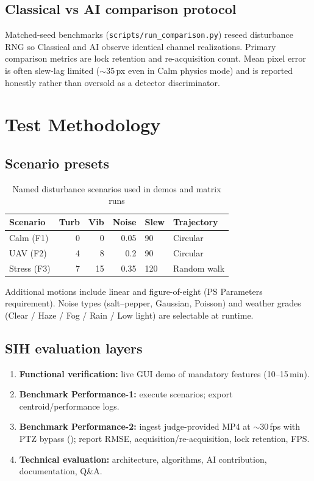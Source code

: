 \documentclass[11pt,a4paper]{article}
\begin{document}
\subsection{Classical vs AI comparison protocol}
Matched-seed benchmarks (\texttt{scripts/run\_comparison.py}) reseed disturbance RNG so Classical and AI observe identical channel realizations.
Primary comparison metrics are lock retention and re-acquisition count.
Mean pixel error is often slew-lag limited ($\sim$35\,px even in Calm physics mode) and is reported honestly rather than oversold as a detector discriminator.

\section{Test Methodology}

\subsection{Scenario presets}
\begin{table}[H]
\centering
\caption{Named disturbance scenarios used in demos and matrix runs}
\label{tab:scenarios}
\begin{tabular}{@{}lrrr ll@{}}
\toprule
Scenario & Turb & Vib & Noise & Slew & Trajectory \\
\midrule
Calm (F1) & 0 & 0 & 0.05 & 90 & Circular \\
UAV (F2) & 4 & 8 & 0.2 & 90 & Circular \\
Stress (F3) & 7 & 15 & 0.35 & 120 & Random walk \\
\bottomrule
\end{tabular}
\end{table}
\noindent
Additional motions include linear and figure-of-eight (PS Parameters requirement).
Noise types (salt--pepper, Gaussian, Poisson) and weather grades (Clear / Haze / Fog / Rain / Low light) are selectable at runtime.

\subsection{SIH evaluation layers}
\begin{enumerate}
  \item \textbf{Functional verification:} live GUI demo of mandatory features (10--15\,min).
  \item \textbf{Benchmark Performance-1:} execute scenarios; export centroid/performance logs.
  \item \textbf{Benchmark Performance-2:} ingest judge-provided MP4 at $\sim$30\,fps with PTZ bypass (); report RMSE, acquisition/re-acquisition, lock retention, FPS.
  \item \textbf{Technical evaluation:} architecture, algorithms, AI contribution, documentation, Q\&A.
\end{enumerate}
\end{document}
